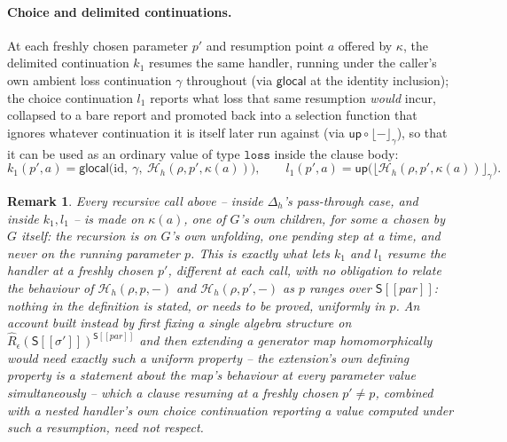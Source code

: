 \documentclass[11pt]{article}
\theoremstyle{plain}
\newtheorem{remark}[theorem]{Remark}
\newcommand{\Ssem}[1]{\mathsf{S}[\![#1]\!]}
\newcommand{\Rm}[1]{\widehat{R}_{#1}}
\newcommand{\eps}{\epsilon}
\newcommand{\up}{\mathsf{up}}
\newcommand{\glocalOp}{\mathsf{glocal}}
\newcommand{\rpt}[2]{\lfloor #1\rfloor_{#2}}
\begin{document}
\paragraph{Choice and delimited continuations.} At each freshly chosen parameter $p'$ and
resumption point $a$ offered by $\kappa$, the delimited continuation $k_1$ resumes the same
handler, running under the caller's own ambient loss continuation $\gamma$ throughout (via
$\glocalOp$ at the identity inclusion); the choice continuation $l_1$ reports what loss that
same resumption \emph{would} incur, collapsed to a bare report and promoted back into a
selection function that ignores whatever continuation it is itself later run against (via
$\up\circ\rpt{-}{\gamma}$), so that it can be used as an ordinary value of type
$\mathtt{loss}$ inside the clause body:
\[
  k_1(p',a) = \glocalOp\big(\mathrm{id},\ \gamma,\ \mathcal H_h(\rho,p',\kappa(a))\big), \qquad
  l_1(p',a) = \up\Big(\rpt{\mathcal H_h(\rho,p',\kappa(a))}{\gamma}\Big).
\]

\begin{remark}
Every recursive call above -- inside $\Delta_h$'s pass-through case, and inside $k_1,l_1$ --
is made on $\kappa(a)$, one of $G$'s own children, for some $a$ chosen by $G$ itself: the
recursion is on $G$'s own unfolding, one pending step at a time, and never on the running
parameter $p$. This is exactly what lets $k_1$ and $l_1$ resume the handler at a freshly
chosen $p'$, different at each call, with no obligation to relate the behaviour of
$\mathcal H_h(\rho,p,-)$ and $\mathcal H_h(\rho,p',-)$ as $p$ ranges over
$\Ssem{\mathit{par}}$: nothing in the definition is stated, or needs to be proved, uniformly
in $p$. An account built instead by first fixing a single algebra structure on
$\Rm\eps(\Ssem{\sigma'})^{\Ssem{\mathit{par}}}$ and then extending a generator map
homomorphically would need exactly such a uniform property -- the extension's own defining
property is a statement about the map's behaviour at \emph{every} parameter value
simultaneously -- which a clause resuming at a freshly chosen $p'\ne p$, combined with a
nested handler's own choice continuation reporting a value computed under such a
resumption, need not respect.
\end{remark}
\end{document}
